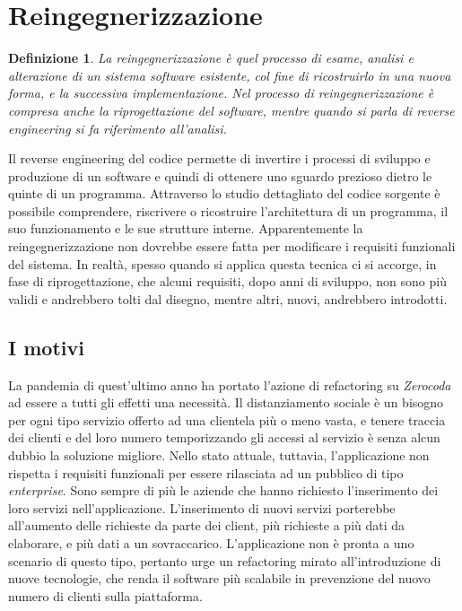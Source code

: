 \section{Reingegnerizzazione}
\newtheorem*{def:reverseengineering}{Definizione}
\begin{def:reverseengineering}
    La reingegnerizzazione è quel processo di esame, analisi e alterazione di un sistema software esistente, col fine di ricostruirlo in una nuova forma, e la successiva implementazione. \cite{chikofsky:reverseengineering} Nel processo di reingegnerizzazione è compresa anche la riprogettazione del software, mentre quando si parla di reverse engineering si fa riferimento all'analisi.
\end{def:reverseengineering}
Il reverse engineering del codice permette di invertire i processi di sviluppo e produzione di un software e quindi di ottenere uno sguardo prezioso dietro le quinte di un programma. Attraverso lo studio dettagliato del codice sorgente è possibile comprendere, riscrivere o ricostruire l’architettura di un programma, il suo funzionamento e le sue strutture interne. Apparentemente la reingegnerizzazione non dovrebbe essere fatta per modificare i requisiti funzionali del sistema. In realtà, spesso quando si applica questa tecnica ci si accorge, in fase di riprogettazione, che alcuni requisiti, dopo anni di sviluppo, non sono più validi e andrebbero tolti dal disegno, mentre altri, nuovi, andrebbero introdotti.

\subsection{I motivi}
La pandemia di quest'ultimo anno ha portato l'azione di refactoring su \emph{Zerocoda} ad essere a tutti gli effetti una necessità. Il distanziamento sociale è un bisogno per ogni tipo servizio offerto ad una clientela più o meno vasta, e tenere traccia dei clienti e del loro numero temporizzando gli accessi al servizio è senza alcun dubbio la soluzione migliore. Nello stato attuale, tuttavia, l'applicazione non rispetta i requisiti funzionali per essere rilasciata ad un pubblico di tipo \emph{enterprise}. Sono sempre di più le aziende che hanno richiesto l'inserimento dei loro servizi nell'applicazione. L'inserimento di nuovi servizi porterebbe all'aumento delle richieste da parte dei client, più richieste a più dati da elaborare, e più dati a un sovraccarico. L'applicazione non è pronta a uno scenario di questo tipo, pertanto urge un refactoring mirato all'introduzione di nuove tecnologie, che renda il software più scalabile in prevenzione del nuovo numero di clienti sulla piattaforma.


